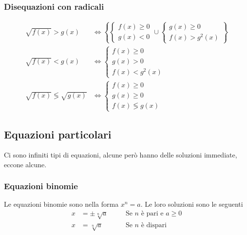 \subsubsection{Disequazioni con radicali}
\begin{align*}
  \sqrt{f(x)} > g(x) &\Leftrightarrow \left\{\begin{cases}
      f(x) \geq 0\\
      g(x) < 0
    \end{cases} \cup \begin{cases}
      g(x) \geq 0\\
      f(x) > g^2(x)
  \end{cases}\right\}\\
  \sqrt{f(x)} < g(x) &\Leftrightarrow \begin{cases}
    f(x) \geq 0\\
    g(x) > 0\\
    f(x) < g^2(x)
  \end{cases}\\
  \sqrt{f(x)} \lessgtr \sqrt{g(x)} &\Leftrightarrow \begin{cases}
    f(x) \geq 0\\
    g(x) \geq 0\\
    f(x) \lessgtr g(x)
  \end{cases}
\end{align*}

\subsection{Equazioni particolari}
Ci sono infiniti tipi di equazioni, alcune però hanno delle soluzioni immediate, eccone alcune.

\subsubsection{Equazioni binomie}
Le equazioni binomie sono nella forma $x^n = a$. Le loro soluzioni sono le seguenti
\begin{align*}
  x &= \pm\sqrt[n]{a} &\quad &\text{Se $n$ è pari e $a\geq0$}\\
  x &= \sqrt[n]{a} &\quad &\text{Se $n$ è dispari}
\end{align*}


